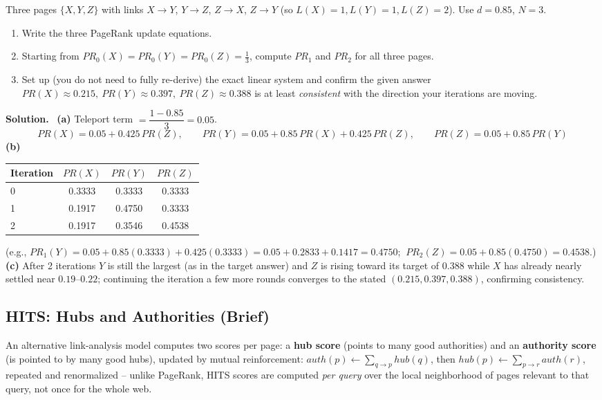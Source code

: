 \documentclass[11pt, a4paper]{article}
\newcommand{\Solution}{\medskip\noindent\textbf{\color{exgreen}Solution.}\ }
\begin{document}
\begin{exercisebox}
Three pages $\{X,Y,Z\}$ with links $X\to Y$, $Y\to Z$, $Z\to X$, $Z\to Y$ (so $L(X)=1, L(Y)=1, L(Z)=2$). Use $d=0.85$, $N=3$.
\begin{enumerate}[label=(\alph*)]
  \item Write the three PageRank update equations.
  \item Starting from $PR_0(X)=PR_0(Y)=PR_0(Z)=\tfrac13$, compute $PR_1$ and $PR_2$ for all three pages.
  \item Set up (you do not need to fully re-derive) the exact linear system and confirm the given answer $PR(X)\approx0.215,\ PR(Y)\approx0.397,\ PR(Z)\approx0.388$ is at least \emph{consistent} with the direction your iterations are moving.
\end{enumerate}
\end{exercisebox}

\Solution
\textbf{(a)} Teleport term $=\dfrac{1-0.85}{3}=0.05$.
\[
PR(X) = 0.05 + 0.425\,PR(Z), \qquad PR(Y) = 0.05 + 0.85\,PR(X) + 0.425\,PR(Z), \qquad PR(Z) = 0.05+0.85\,PR(Y)
\]
\textbf{(b)}
\begin{center}
\begin{tabular}{@{}lccc@{}}
\toprule
Iteration & $PR(X)$ & $PR(Y)$ & $PR(Z)$ \\
\midrule
0 & 0.3333 & 0.3333 & 0.3333 \\
1 & 0.1917 & 0.4750 & 0.3333 \\
2 & 0.1917 & 0.3546 & 0.4538 \\
\bottomrule
\end{tabular}
\end{center}
(e.g., $PR_1(Y) = 0.05+0.85(0.3333)+0.425(0.3333) = 0.05+0.2833+0.1417=0.4750$; $\ PR_2(Z)=0.05+0.85(0.4750)=0.4538$.)\\
\textbf{(c)} After 2 iterations $Y$ is still the largest (as in the target answer) and $Z$ is rising toward its target of $0.388$ while $X$ has already nearly settled near $0.19$--$0.22$; continuing the iteration a few more rounds converges to the stated $(0.215, 0.397, 0.388)$, confirming consistency.

\subsection{HITS: Hubs and Authorities (Brief)}

An alternative link-analysis model computes two scores per page: a \textbf{hub score} (points to many good authorities) and an \textbf{authority score} (is pointed to by many good hubs), updated by mutual reinforcement: $auth(p) \leftarrow \sum_{q\to p} hub(q)$, then $hub(p) \leftarrow \sum_{p \to r} auth(r)$, repeated and renormalized -- unlike PageRank, HITS scores are computed \emph{per query} over the local neighborhood of pages relevant to that query, not once for the whole web.
\end{document}
